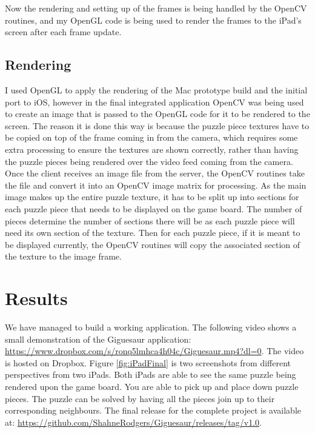 \documentclass{article}
\begin{document}
Now the rendering and setting up of the frames is being handled by the OpenCV
routines, and my OpenGL code is being used to render the frames to the iPad's
screen after each frame update. 

\subsection{Rendering}
I used OpenGL to apply the rendering of the Mac prototype build and the initial
port to iOS, however in the final integrated application OpenCV was being used
to create an image that is passed to the OpenGL code for it to be rendered to
the screen. The reason it is done this way is because the puzzle piece textures
have to be copied on top of the frame coming in from the camera, which requires
some extra processing to ensure the textures are shown correctly, rather than
having the puzzle pieces being rendered over the video feed coming from the
camera. Once the client receives an image file from the server, the OpenCV
routines take the file and convert it into an OpenCV image matrix for
processing. As the main image makes up the entire puzzle texture, it has to be
split up into sections for each puzzle piece that needs to be displayed on the
game board. The number of pieces determine the number of sections there will be
as each puzzle piece will need its own section of the texture. Then for each
puzzle piece, if it is meant to be displayed currently, the OpenCV routines will
copy the associated section of the texture to the image frame.


\section{Results}
We have managed to build a working application. The following video shows a
small demonstration of the Giguesaur application:
\url{https://www.dropbox.com/s/ronq5lmhca4h04c/Giguesaur.mp4?dl=0}. The video is
hosted on Dropbox. Figure \ref{fig:iPadFinal} is two screenshots from different
perspectives from two iPads. Both iPads are able to see the same puzzle being
rendered upon the game board. You are able to pick up and place down puzzle
pieces. The puzzle can be solved by having all the pieces join up to their
corresponding neighbours. The final release for the complete project is
available at:
\url{https://github.com/ShahneRodgers/Giguesaur/releases/tag/v1.0}.
\end{document}
